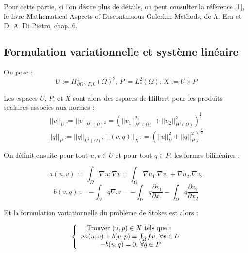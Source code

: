 \documentclass[a4paper,12pt]{article}
\begin{document}
Pour cette partie, si l'on désire plus de détails, on peut consulter la référence [1], le livre Mathematical Aspects of Discontinuous Galerkin Methods, de A. Ern et D. A. Di Pietro, chap. 6.


\subsection{Formulation variationnelle et système linéaire}

On pose :
\begin{equation}
U := H^{1}_{\partial \Omega \backslash \Gamma, 0}\left(\Omega\right)^{2} \text{, } P := L^{2}_{*}\left(\Omega\right) \text{, } X := U \times P
\end{equation}

Les espaces $U$, $P$, et $X$ sont alors des espaces de Hilbert pour les produits scalaires associés aux normes :
\begin{equation}
||v||_{U} := ||v||_{H^{1}\left(\Omega\right)^{2}} = \left( ||v_{1}||_{H^{1}\left(\Omega\right)}^{2}+||v_{2}||_{H^{1}\left(\Omega\right)}^{2} \right)^{\frac{1}{2}}
\end{equation}
\begin{equation}
||q||_{P} := ||q||_{L^{2}\left(\Omega\right)} \text{, } ||\left(v,q\right)||_{X} : = \left( ||u||_{U}^{2}+||q||_{P}^{2} \right)^{\frac{1}{2}}
\end{equation}

On définit ensuite pour tout $u,v \in U$ et pour tout $q \in P$, les formes bilinéaires :

\begin{equation}
a(u,v) := \int_{\Omega} \nabla u : \nabla v = \int_{\Omega} \nabla u_{1} . \nabla v_{1} + \nabla u_{2} . \nabla v_{2}
\end{equation}
\begin{equation}
 b(v,q) := -\int_{\Omega} q \nabla . v = - \int_{\Omega} q \frac{\partial v_{1}}{\partial x_{1}} - \int_{\Omega} q \frac{\partial v_{2}}{\partial x_{2}}
\end{equation}


Et la formulation variationnelle du problème de Stokes est alors :

\begin{equation}
\left \{
\begin{array}{c @{} c}
\text{Trouver } (u,p) \in X \text{ tels que : } \\
\nu a(u,v) + b(v,p) = \int_{\Omega} fv \text{, } \forall v \in U \\
-b(u,q) = 0 \text{, } \forall q \in P\\
\end{array}
\right.
\end{equation}
\end{document}
